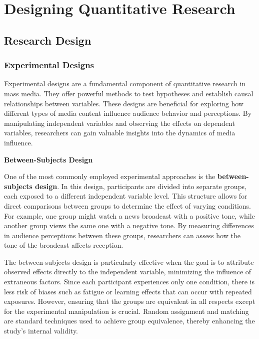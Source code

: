 \documentclass[
]{book}
\begin{document}
\chapter{Designing Quantitative Research}\label{designing-quantitative-research}

\section{Research Design}\label{research-design}

\subsection*{Experimental Designs}\label{experimental-designs}

Experimental designs are a fundamental component of quantitative research in mass media. They offer powerful methods to test hypotheses and establish causal relationships between variables. These designs are beneficial for exploring how different types of media content influence audience behavior and perceptions. By manipulating independent variables and observing the effects on dependent variables, researchers can gain valuable insights into the dynamics of media influence.

\textbf{Between-Subjects Design}

One of the most commonly employed experimental approaches is the \textbf{between-subjects design}. In this design, participants are divided into separate groups, each exposed to a different independent variable level. This structure allows for direct comparisons between groups to determine the effect of varying conditions. For example, one group might watch a news broadcast with a positive tone, while another group views the same one with a negative tone. By measuring differences in audience perceptions between these groups, researchers can assess how the tone of the broadcast affects reception.

The between-subjects design is particularly effective when the goal is to attribute observed effects directly to the independent variable, minimizing the influence of extraneous factors. Since each participant experiences only one condition, there is less risk of biases such as fatigue or learning effects that can occur with repeated exposures. However, ensuring that the groups are equivalent in all respects except for the experimental manipulation is crucial. Random assignment and matching are standard techniques used to achieve group equivalence, thereby enhancing the study's internal validity.
\end{document}
